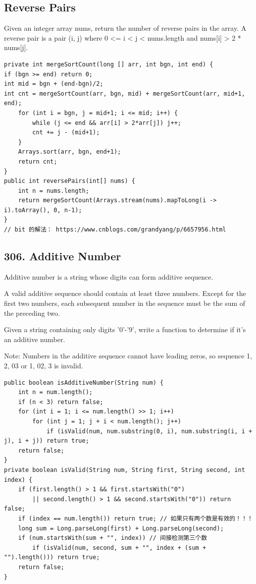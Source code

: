 \documentclass[9pt, b5paaper]{book}
\begin{document}
\subsection{Reverse Pairs}
\label{sec-9-0-2}
Given an integer array nums, return the number of reverse pairs in the array.
A reverse pair is a pair (i, j) where 0 <= i < j < nums.length and nums[i] > 2 * nums[j].
\begin{verbatim}
private int mergeSortCount(long [] arr, int bgn, int end) {
if (bgn >= end) return 0;
int mid = bgn + (end-bgn)/2;
int cnt = mergeSortCount(arr, bgn, mid) + mergeSortCount(arr, mid+1, end);
    for (int i = bgn, j = mid+1; i <= mid; i++) {
        while (j <= end && arr[i] > 2*arr[j]) j++;
        cnt += j - (mid+1);
    }
    Arrays.sort(arr, bgn, end+1);
    return cnt;
}
public int reversePairs(int[] nums) {
    int n = nums.length;
    return mergeSortCount(Arrays.stream(nums).mapToLong(i -> i).toArray(), 0, n-1);
}
// bit 的解法： https://www.cnblogs.com/grandyang/p/6657956.html
\end{verbatim}

\subsection{306. Additive Number}
\label{sec-9-0-3}
Additive number is a string whose digits can form additive sequence.

A valid additive sequence should contain at least three numbers. Except for the first two numbers, each subsequent number in the sequence must be the sum of the preceding two.

Given a string containing only digits '0'-'9', write a function to determine if it's an additive number.

Note: Numbers in the additive sequence cannot have leading zeros, so sequence 1, 2, 03 or 1, 02, 3 is invalid.
\begin{verbatim}
public boolean isAdditiveNumber(String num) {
    int n = num.length();
    if (n < 3) return false;
    for (int i = 1; i <= num.length() >> 1; i++)
        for (int j = 1; j + i < num.length(); j++)  
            if (isValid(num, num.substring(0, i), num.substring(i, i + j), i + j)) return true;
    return false;
}
private boolean isValid(String num, String first, String second, int index) {
    if (first.length() > 1 && first.startsWith("0") 
        || second.length() > 1 && second.startsWith("0")) return false;
    if (index == num.length()) return true; // 如果只有两个数是有效的！！！
    long sum = Long.parseLong(first) + Long.parseLong(second);
    if (num.startsWith(sum + "", index)) // 间接检测第三个数
        if (isValid(num, second, sum + "", index + (sum + "").length())) return true;
    return false;
}
\end{verbatim}
\end{document}

